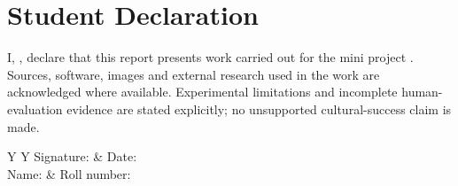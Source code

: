 \chapter*{Student Declaration}
I, \StudentName, declare that this report presents work carried out for the mini project \emph{\ProjectTitle}. Sources, software, images and external research used in the work are acknowledged where available. Experimental limitations and incomplete human-evaluation evidence are stated explicitly; no unsupported cultural-success claim is made.
\vspace{2cm}
\begin{tabularx}{\textwidth}{Y Y}
Signature: \hrulefill & Date: \hrulefill\\[1.5cm]
Name: \StudentName & Roll number: \hrulefill
\end{tabularx}
\clearpage

